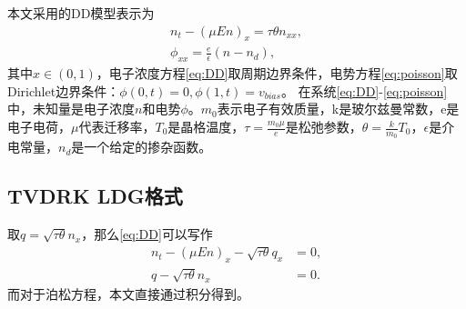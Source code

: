 本文采用的DD模型表示为
\begin{align}
    n_t - (\mu En)_x = \tau \theta n_{xx}, \label{eq:DD} \\
    \phi_{xx} = \frac{e}{\epsilon}(n - n_d),  \label{eq:poisson}
\end{align}
其中$x\in(0,1)$，电子浓度方程\eqref{eq:DD}取周期边界条件，电势方程\eqref{eq:poisson}取Dirichlet边界条件：$\phi(0,t) = 0, \phi(1,t) = v_{bias}$。
在系统\eqref{eq:DD}-\eqref{eq:poisson}中，未知量是电子浓度$n$和电势$\phi$。$m_0$表示电子有效质量，k是玻尔兹曼常数，e是电子电荷，$\mu$代表迁移率，$T_0$是晶格温度，$\tau = \frac{m_0 \mu}{e}$是松弛参数，$\theta = \frac{k}{m_0}T_0$，$\epsilon$是介电常量，$n_d$是一个给定的掺杂函数。

\subsection{TVDRK LDG格式}
取$q = \sqrt{\tau \theta }n_x$，那么\autoref{eq:DD}可以写作
\begin{align}
    n_t - (\mu E n)_x - \sqrt{\tau \theta}q_x & = 0, \label{eq:DD:electronConcentration} \\
    q - \sqrt{\tau \theta}n_x                 & = 0. \label{eq:DD:auxiliaryFunction}
\end{align}
而对于泊松方程，本文直接通过积分得到。

